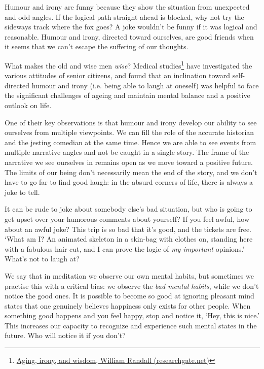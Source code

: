 Humour and irony are funny because they show the situation from
unexpected and odd angles. If the logical path straight ahead is
blocked, why not try the sideways track where the fox goes? A joke
wouldn't be funny if it was logical and reasonable. Humour and irony,
directed toward ourselves, are good friends when it seems that we can't
escape the suffering of our thoughts.

What makes the old and wise men \emph{wise}? Medical studies\footnote{\href{https://www.researchgate.net/publication/258190619_Aging_irony_and_wisdom_On_the_narrative_psychology_of_later_life}{Aging,
  irony, and wisdom, William Randall (researchgate.net)}} have
investigated the various attitudes of senior citizens, and found that an
inclination toward self-directed humour and irony (i.e. being able to
laugh at oneself) was helpful to face the significant challenges of
ageing and maintain mental balance and a positive outlook on life.

One of their key observations is that humour and irony develop our
ability to see ourselves from multiple viewpoints. We can fill the role
of the accurate historian and the jesting comedian at the same time.
Hence we are able to see events from multiple narrative angles and not
be caught in a single story. The frame of the narrative we see ourselves
in remains open as we move toward a positive future. The limits of our
being don't necessarily mean the end of the story, and we don't have to
go far to find good laugh: in the absurd corners of life, there is
always a joke to tell.

It can be rude to joke about somebody else's bad situation, but who is
going to get upset over your humorous comments about yourself? If you
feel awful, how about an awful joke? This trip is so bad that it's good,
and the tickets are free. `What am I? An animated skeleton in a skin-bag
with clothes on, standing here with a fabulous hair-cut, and I can prove
the logic of \emph{my important} opinions.' What's not to laugh at?

We say that in meditation we observe our own mental habits, but
sometimes we practise this with a critical bias: we observe the
\emph{bad mental habits}, while we don't notice the good ones. It is
possible to become so good at ignoring pleasant mind states that one
genuinely believes happiness only exists for other people. When
something good happens and you feel happy, stop and notice it, `Hey,
this is nice.' This increases our capacity to recognize and experience
such mental states in the future. Who will notice it if you don't?

